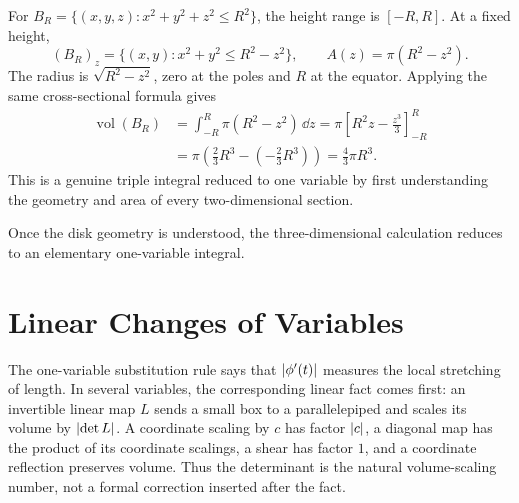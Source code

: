 \begin{example}\label{ex:ball-slices}
For $B_R=\{(x,y,z):x^2+y^2+z^2\leq R^2\}$, the height range is $[-R,R]$.
At a fixed height,
\[
(B_R)_z=\{(x,y):x^2+y^2\leq R^2-z^2\},\qquad
A(z)=\pi(R^2-z^2).
\]
The radius is $\sqrt{R^2-z^2}$, zero at the poles and $R$ at the equator.
Applying the same cross-sectional formula gives
\begin{align*}
\operatorname{vol}(B_R)
&=\int_{-R}^R\pi(R^2-z^2)\,\dd z
=\pi\left[R^2z-\frac{z^3}{3}\right]_{-R}^R\\
&=\pi\left(\frac23R^3-\left(-\frac23R^3\right)\right)
=\frac43\pi R^3.
\end{align*}
This is a genuine triple integral reduced to one variable by first
understanding the geometry and area of every two-dimensional section.

\noindent\begin{minipage}{\linewidth}
\begin{center}
\end{center}
Once the disk geometry is understood, the three-dimensional calculation
reduces to an elementary one-variable integral.
\end{minipage}
\end{example}

\section{Linear Changes of Variables}

The one-variable substitution rule says that $\lvert \phi'(t)\rvert$ measures the
local stretching of length.  In several variables, the corresponding linear
fact comes first: an invertible linear map $L$ sends a small box to a
parallelepiped and scales its volume by $\lvert \det L\rvert$.  A coordinate scaling
by $c$ has factor $\lvert c\rvert$, a diagonal map has the product of its coordinate
scalings, a shear has factor $1$, and a coordinate reflection preserves volume.
Thus the determinant is the natural volume-scaling number, not a formal
correction inserted after the fact.

